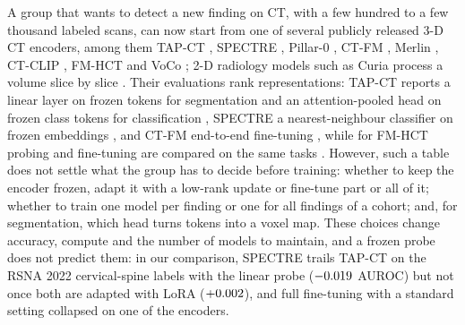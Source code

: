 A group that wants to detect a new finding on CT, with a few hundred to a few thousand labeled scans, can now start from one of several publicly released 3-D CT encoders, among them TAP-CT \citep{veenboer2025tapct}, SPECTRE \citep{claessens2025spectre}, Pillar-0 \citep{agrawal2025pillar0}, CT-FM \citep{pai2025ctfm}, Merlin \citep{blankemeier2026merlin}, CT-CLIP \citep{hamamci2026ctrate}, FM-HCT \citep{zhu2025fmct} and VoCo \citep{wu2024voco,wu2024vocolarge}; 2-D radiology models such as Curia process a volume slice by slice \citep{dancette2025curia}. Their evaluations rank representations: TAP-CT reports a linear layer on frozen tokens for segmentation and an attention-pooled head on frozen class tokens for classification \citep{veenboer2025tapct}, SPECTRE a nearest-neighbour classifier on frozen embeddings \citep{claessens2025spectre}, and CT-FM end-to-end fine-tuning \citep{pai2025ctfm}, while for FM-HCT probing and fine-tuning are compared on the same tasks \citep{zhu2025fmct}. However, such a table does not settle what the group has to decide before training: whether to keep the encoder frozen, adapt it with a low-rank update \citep{hu2022lora} or fine-tune part or all of it; whether to train one model per finding or one for all findings of a cohort; and, for segmentation, which head turns tokens into a voxel map. These choices change accuracy, compute and the number of models to maintain, and a frozen probe does not predict them: in our comparison, SPECTRE trails TAP-CT on the RSNA 2022 cervical-spine labels with the linear probe ($-0.019$ AUROC) but not once both are adapted with LoRA ($+0.002$), and full fine-tuning with a standard setting collapsed on one of the encoders.

